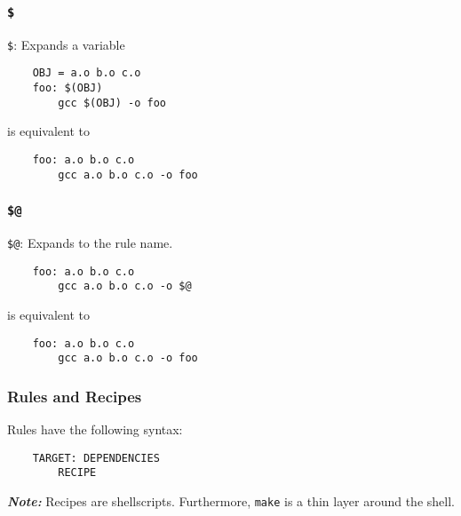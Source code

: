 \documentclass[13pt]{article}
\begin{document}
\subsubsection{\texttt{\$}}
\texttt{\$}: Expands a variable
\begin{verbatim}
    OBJ = a.o b.o c.o
    foo: $(OBJ)
        gcc $(OBJ) -o foo
\end{verbatim}
is equivalent to 
\begin{verbatim}
    foo: a.o b.o c.o
        gcc a.o b.o c.o -o foo
\end{verbatim}

\subsubsection{\texttt{\$@}}
\texttt{\$@}: Expands to the rule name.
\begin{verbatim}
    foo: a.o b.o c.o
        gcc a.o b.o c.o -o $@
\end{verbatim}
is equivalent to 
\begin{verbatim}
    foo: a.o b.o c.o
        gcc a.o b.o c.o -o foo
\end{verbatim}

\subsubsection{Rules and Recipes}
Rules have the following syntax:
\begin{verbatim}
    TARGET: DEPENDENCIES
        RECIPE
\end{verbatim}
\textit{\textbf{Note:}} Recipes are shellscripts. Furthermore, \texttt{make} is a thin layer around the shell.





\end{document}
